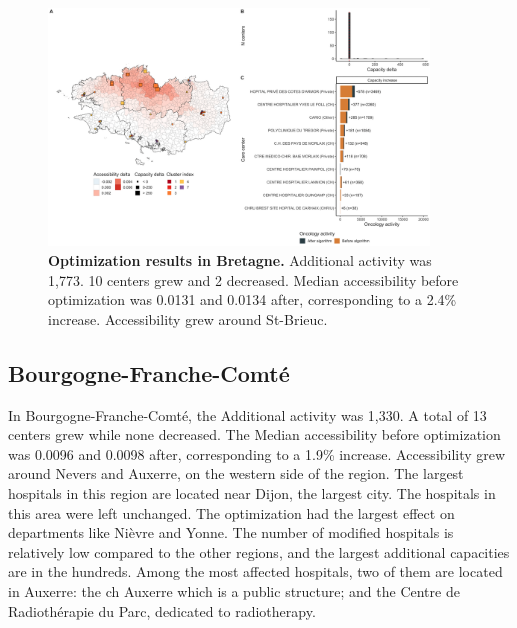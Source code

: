 \begin{figure}[H]
    \includegraphics[width=0.9\textwidth]{images/camion/optim_region/optim_Bretagne.png}
    \centering
    \caption{ \textbf{Optimization results in Bretagne.} Additional activity was
        1,773. 10 centers grew and 2 decreased. Median accessibility before
        optimization was 0.0131 and 0.0134 after, corresponding to a 2.4\%
        increase. Accessibility grew around St-Brieuc. }
\end{figure}

\subsection*{Bourgogne-Franche-Comté}

In Bourgogne-Franche-Comté, the Additional activity was 1,330. A total of 13
centers grew while none decreased. The Median accessibility before optimization
was 0.0096 and 0.0098 after, corresponding to a 1.9\% increase. Accessibility grew
around Nevers and Auxerre, on the western side of the region. The largest hospitals
in this region are located near Dijon, the largest city. The hospitals in this
area were left unchanged. The optimization had the largest effect on departments
like Nièvre and Yonne. The number of modified hospitals is relatively low compared
to the other regions, and the largest additional capacities are in the hundreds.
Among the most affected hospitals, two of them are located in Auxerre: the
\ac{ch} Auxerre which is a public structure; and the Centre de Radiothérapie
du Parc, dedicated to radiotherapy.

